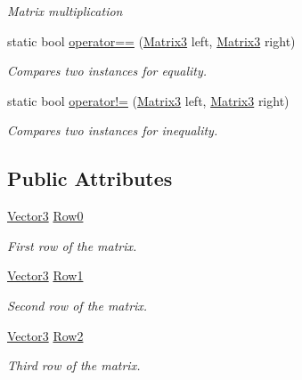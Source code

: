 \begin{DoxyCompactItemize}
\begin{DoxyCompactList}\small\item\em Matrix multiplication \end{DoxyCompactList}\item 
static bool \hyperlink{struct_open_t_k_1_1_matrix3_abd56c5a250d6aa9bfc067ed04ad6070c}{operator==} (\hyperlink{struct_open_t_k_1_1_matrix3}{Matrix3} left, \hyperlink{struct_open_t_k_1_1_matrix3}{Matrix3} right)
\begin{DoxyCompactList}\small\item\em Compares two instances for equality. \end{DoxyCompactList}\item 
static bool \hyperlink{struct_open_t_k_1_1_matrix3_ab25259b37cbab498f4a9cd8026b360e3}{operator!=} (\hyperlink{struct_open_t_k_1_1_matrix3}{Matrix3} left, \hyperlink{struct_open_t_k_1_1_matrix3}{Matrix3} right)
\begin{DoxyCompactList}\small\item\em Compares two instances for inequality. \end{DoxyCompactList}\end{DoxyCompactItemize}
\subsection*{Public Attributes}
\begin{DoxyCompactItemize}
\item 
\hyperlink{struct_open_t_k_1_1_vector3}{Vector3} \hyperlink{struct_open_t_k_1_1_matrix3_a0e9a63d9e068334a8a59b7ef11f04a04}{Row0}
\begin{DoxyCompactList}\small\item\em First row of the matrix. \end{DoxyCompactList}\item 
\hyperlink{struct_open_t_k_1_1_vector3}{Vector3} \hyperlink{struct_open_t_k_1_1_matrix3_a3b1b4bd41092d6345c5275c8fd4eb236}{Row1}
\begin{DoxyCompactList}\small\item\em Second row of the matrix. \end{DoxyCompactList}\item 
\hyperlink{struct_open_t_k_1_1_vector3}{Vector3} \hyperlink{struct_open_t_k_1_1_matrix3_ab9641e83181cc566159d3f2e033f1e5b}{Row2}
\begin{DoxyCompactList}\small\item\em Third row of the matrix. \end{DoxyCompactList}\end{DoxyCompactItemize}
